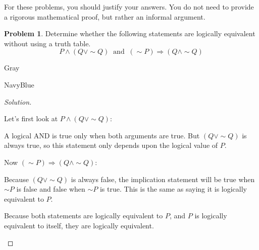\documentclass[12pt]{amsart}
\newcounter{problem_number}[section]
\theoremstyle{named}
\newenvironment{soln}
{\begin{color}{Gray}\begin{framed}\begin{color}{NavyBlue}\begin{proof}[Solution]
\doublespacing}
{\end{proof}\end{color}\end{framed}\end{color}}
\theoremstyle{definition}
\newtheorem{problem}{Problem}
\begin{document}
For these problems, you should justify your answers. You do not need to provide a rigorous mathematical proof, but rather an informal argument.

\vspace{5mm}



\begin{problem}
	Determine whether the following statements are logically equivalent without using a truth table.
	$$P\wedge(Q\vee\sim Q)\ \text{ and }\ (\sim P)\Rightarrow (Q\wedge\sim Q)$$
\end{problem}

\begin{soln}
	\phantom{ }
    \begin{adjustwidth}{2em}{0em} 
        Let's first look at $P \land (Q \lor \sim Q)$:
        \begin{adjustwidth}{2em}{0em} 
            A logical AND is true only when both arguments are true.
            But $(Q \lor \sim Q)$ is always true, so this statement
            only depends upon the logical value of $P$. 
        \end{adjustwidth}

        \noindent Now $(\sim P)\Rightarrow (Q\wedge\sim Q)$:
        \begin{adjustwidth}{2em}{0em}
            Because $(Q \lor \sim Q)$ is always false, the implication
            statement will be true when $\sim P$ is false and false when
            $\sim P$ is true. This is the same as saying it is logically equivalent
            to $P$. 
        \end{adjustwidth}

        \noindent Because both statements are logically equivalent to $P$, and $P$ is
        logically equivalent to itself, they are logically equivalent.
    \end{adjustwidth}
    \phantom{ }

    \phantom{ }

    \phantom{ }

    \phantom{ }

    \phantom{ }

    \phantom{ }

    \phantom{ }

    \phantom{ }

    \phantom{ }

    \phantom{ }

    \phantom{ }

    \phantom{ }

    \phantom{ }
\end{soln}
\end{document}
